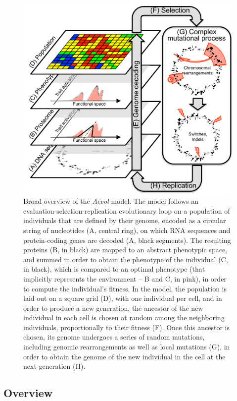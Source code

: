 \begin{figure}[H]
\includegraphics[width=\textwidth]{aevol/images/aevol.pdf}
\caption[Overview of the \emph{Aevol} model]{Broad overview of the \emph{Aevol} model.
The model follows an evaluation-selection-replication evolutionary loop on a population of individuals that are defined by their genome, encoded as a circular string of nucleotides (A, central ring), on which RNA sequences and protein-coding genes are decoded (A, black segments).
The resulting proteins (B, in black) are mapped to an abstract phenotypic space, and summed in order to obtain the phenotype of the individual (C, in black), which is compared to an optimal phenotype (that implicitly represents the environment -- B and C, in pink), in order to compute the individual's fitness.
In the model, the population is laid out on a square grid (D), with one individual per cell, and in order to produce a new generation, the ancestor of the new individual in each cell is chosen at random among the neighboring individuals, proportionally to their fitness (F).
Once this ancestor is chosen, its genome undergoes a series of random mutations, including genomic rearrangements as well as local mutations (G), in order to obtain the genome of the new individual in the cell at the next generation (H).}
\label{fig:aevol:model}
\end{figure}

\subsection{Overview}

